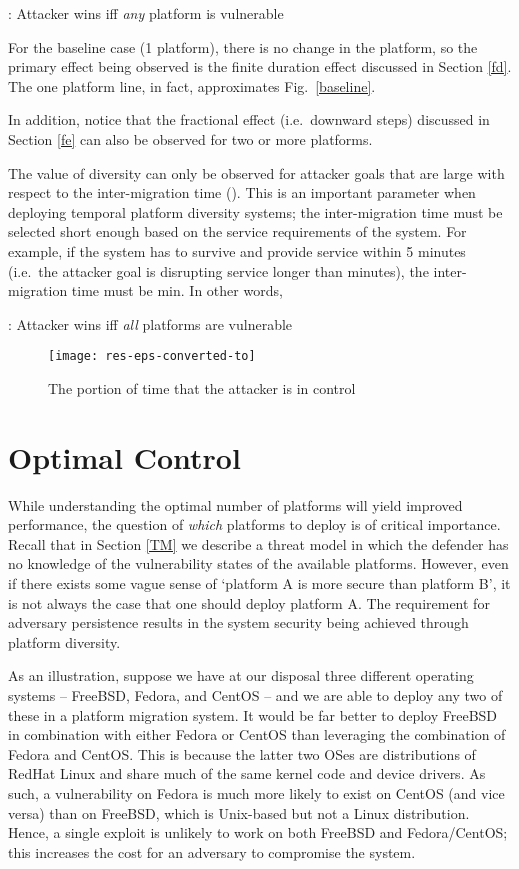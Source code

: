 \documentclass{acm_proc_article-sp}
\begin{document}
 : Attacker wins iff \textit{any} platform is vulnerable

For the baseline case (1 platform), there is no change in the platform, so the primary effect being observed is the finite duration effect discussed in Section \ref{fd}. The one platform line, in fact, approximates Fig.~\ref{baseline}. 

In addition, notice that the fractional effect (i.e.~downward steps) discussed in Section \ref{fe} can also be observed for two or more platforms.

The value of diversity can only be observed for attacker goals that are large with respect to the inter-migration time (). This is an important parameter when deploying temporal platform diversity systems; the inter-migration time must be selected short enough based on the service requirements of the system. For example, if the system has to survive and provide service within 5 minutes (i.e.~the attacker goal is disrupting service longer than  minutes), the inter-migration time must be  min. In other words,

 : Attacker wins iff \textit{all} platforms are vulnerable

\begin{figure}
\begin{centering}
\texttt{[image: res-eps-converted-to]}
\end{centering}
\caption{The portion of time that the attacker is in control }
\label{FigureResults1}
\end{figure}

\section{Optimal Control}
\label{GTOC}

While understanding the optimal number of platforms will yield improved performance, the question of \emph{which} platforms to deploy is of critical importance. Recall that in Section \ref{TM} we describe a threat model in which the defender has no knowledge of the vulnerability states of the available platforms. However, even if there exists some vague sense of `platform A is more secure than platform B', it is not always the case that one should deploy platform A. The requirement for adversary persistence results in the system security being achieved through platform diversity.

As an illustration, suppose we have at our disposal three different operating systems -- FreeBSD, Fedora, and CentOS -- and we are able to deploy any two of these in a platform migration system. It would be far better to deploy FreeBSD in combination with either Fedora or CentOS than leveraging the combination of Fedora and CentOS. This is because the latter two OSes are distributions of RedHat Linux and share much of the same kernel code and device drivers. As such, a vulnerability on Fedora is much more likely to exist on CentOS (and vice versa) than on FreeBSD, which is Unix-based but not a Linux distribution. Hence, a single exploit is unlikely to work on both FreeBSD and Fedora/CentOS; this increases the cost for an adversary to compromise the system.
\end{document}
